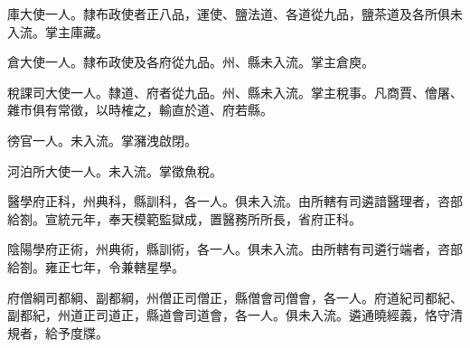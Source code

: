 \begin{pinyinscope}
庫大使一人。隸布政使者正八品，運使、鹽法道、各道從九品，鹽茶道及各所俱未入流。掌主庫藏。

倉大使一人。隸布政使及各府從九品。州、縣未入流。掌主倉庾。

稅課司大使一人。隸道、府者從九品。州、縣未入流。掌主稅事。凡商賈、儈屠、雜巿俱有常徵，以時榷之，輸直於道、府若縣。

徬官一人。未入流。掌瀦洩啟閉。

河泊所大使一人。未入流。掌徵魚稅。

醫學府正科，州典科，縣訓科，各一人。俱未入流。由所轄有司遴諳醫理者，咨部給劄。宣統元年，奉天模範監獄成，置醫務所所長，省府正科。

陰陽學府正術，州典術，縣訓術，各一人。俱未入流。由所轄有司遴行端者，咨部給劄。雍正七年，令兼轄星學。

府僧綱司都綱、副都綱，州僧正司僧正，縣僧會司僧會，各一人。府道紀司都紀、副都紀，州道正司道正，縣道會司道會，各一人。俱未入流。遴通曉經義，恪守清規者，給予度牒。


\end{pinyinscope}